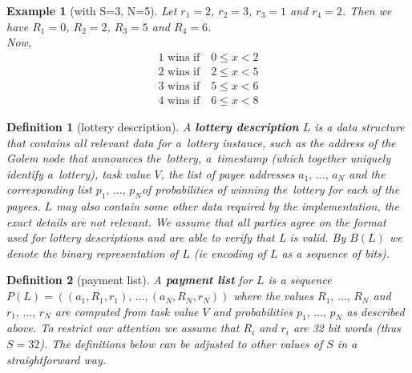 \documentclass[a4paper]{article}
\newtheorem*{dfnt}{Definition}
\newtheorem*{exmp}{Example}
\begin{document}
    \begin{exmp}[with S=3, N=5]
        Let $r_1 = 2$, $r_2 = 3$, $r_3 = 1$ and $r_4 = 2$. Then we have $R_1 = 0$, $R_2 = 2$, $R_3 = 5$ and $R_4 = 6$.\\
        Now,
        \begin{displaymath}
            \begin{array}{c}
                1 \text{ wins if} \quad 0 \leq x < 2\\
                2 \text{ wins if} \quad 2 \leq x < 5\\
                3 \text{ wins if} \quad 5 \leq x < 6\\
                4 \text{ wins if} \quad 6 \leq x < 8
            \end{array}
        \end{displaymath}
    \end{exmp}

    \begin{dfnt}[lottery description]
        A \textbf{lottery description} $L$ is a data structure that contains all relevant data for a~lottery instance,
        such as the address of the Golem node that announces the~lottery, a~timestamp (which together uniquely identify
        a~lottery), task value $V$, the list of payee addresses $a_1,\,\ldots,\, a_N$ and the corresponding list
        $p_1, \,\ldots,\, p_N $of probabilities of winning the~lottery for each of the payees. $L$ may also contain
        some other data required by the implementation, the exact details are not relevant. We assume that all parties
        agree on the format used for lottery descriptions and are able to verify that L is valid. By $B(L)$ we denote
        the binary representation of $L$ (ie encoding of $L$ as a sequence of bits).
    \end{dfnt}


    \begin{dfnt}[payment list]
        A \textbf{payment list} for $L$ is a sequence $P(L) = ((a_1, R_1, r_1), \,\ldots, (a_N, R_N, r_N))$ where the values
        $R_1,\,\ldots,\, R_N$ and $r_1,\,\ldots,\, r_N$ are computed from task value $V$ and probabilities
        $p_1,\,\ldots,\,p_N$ as described above. To restrict our attention we assume that $R_i$ and $r_i$ are 32 bit
        words (thus $S = 32$). The definitions below can be adjusted to other values of $S$ in a straightforward way.
    \end{dfnt}
\end{document}
